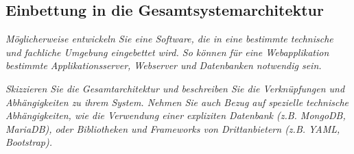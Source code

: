 \subsection{Einbettung in die Gesamtsystemarchitektur}

\textit{
    Möglicherweise entwickeln Sie eine Software, die in eine bestimmte technische und fachliche Umgebung eingebettet wird. So können für eine Webapplikation bestimmte Applikationsserver, Webserver und Datenbanken notwendig sein.
}

\textit{
    Skizzieren Sie die Gesamtarchitektur und beschreiben Sie die Verknüpfungen und Abhängigkeiten zu ihrem System. Nehmen Sie auch Bezug auf spezielle technische Abhängigkeiten, wie die Verwendung einer expliziten Datenbank (z.B. MongoDB, MariaDB), oder Bibliotheken und Frameworks von Drittanbietern (z.B. YAML, Bootstrap).
}

